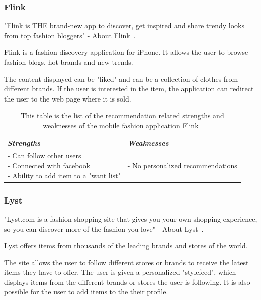 \subsubsection{Flink} %
\label{par:flink}
    "Flink is THE brand-new app to discover, get inspired and share trendy looks from top fashion bloggers" - About Flink~\cite{flink}.

    Flink is a fashion discovery application for iPhone.
    It allows the user to browse fashion blogs, hot brands and new trends.

    The content displayed can be "liked" and can be a collection of clothes from different brands.
    If the user is interested in the item, the application can redirect the user to the web page where it is sold.
    \begin{table}[H]
        \centering
        \begin{tabular}{l|l}
            \toprule
            \emph{Strengths} & \emph{Weaknesses} \\ \hline
            \pbox{9cm}{
                - Can follow other users \\
                - Connected with facebook \\
                - Ability to add item to a "want list"
            } & \pbox{9cm}{
                - No personalized recommendations \\
            } \\ \bottomrule
        \end{tabular}
        \caption[Recommendation related strengths and weaknesses of Flink~\cite{flink}]{This table is the list of the recommendation related strengths and weaknesses of the mobile fashion application Flink~\cite{flink}}
        \label{table:iphoneAppFlink}
    \end{table}

\subsubsection{Lyst} %
\label{par:lyst}
    "Lyst.com is a fashion shopping site that gives you your own shopping experience, so you can discover more of the fashion you love" - About Lyst~\cite{lyst}.

    Lyst offers items from thousands of the leading brands and stores of the world.

    The site allows the user to follow different stores or brands to receive the latest items they have to offer.
    The user is given a personalized "stylefeed", which displays items from the different brands or stores the user is following.
    It is also possible for the user to add items to the their profile.

